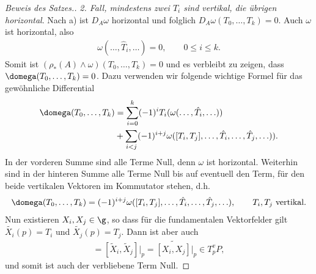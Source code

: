 \documentclass[%
	paper=a5,%
	fleqn,%
	DIV=18,%
	BCOR=0mm,
	fontsize=11pt,
	titlepage=false,%
	bibliography=totoc,
	DIV=18,%
	twoside=true,
	pdftitle=Riemannsche Geometrie,
	pdfauthor=Uwe Semmelmann,
	numbers=noendperiod]%
	{scrbook}
\begin{document}
\begin{proof}[Beweis des Satzes.]
\textit{2. Fall, mindestens zwei $T_i$ sind vertikal, die übrigen horizontal}.
Nach a) ist $D_A\omega$ horizontal und folglich
$D_A\omega(T_0,\ldots,T_k) = 0$. Auch $\omega$ ist horizontal, also
\begin{align*}
\omega(\ldots,\hat{T}_i,\ldots) = 0,\qquad 0\le i\le k.
\end{align*}
Somit ist $(\rho_*(A)\wedge\omega)(T_0,\ldots,T_k) = 0$ und es verbleibt zu
zeigen, dass $\domega(T_0,\ldots,T_k) =0$. Dazu verwenden wir
folgende wichtige Formel für das gewöhnliche Differential
\begin{align*}
\domega(T_0,\ldots,T_k) &= 
\sum_{i=0}^k (-1)^i T_i(\omega(\ldots,\hat{T}_i,\ldots))\\
&+
\sum_{i<j} (-1)^{i+j}
\omega([T_i,T_j],\ldots,\hat{T}_i,\ldots,\hat{T}_j,\ldots)).
\end{align*}
In der vorderen Summe sind alle Terme Null, denn $\omega$ ist horizontal.
Weiterhin sind in der hinteren Summe alle Terme Null bis auf eventuell den Term,
für den beide vertikalen Vektoren im Kommutator stehen, d.h.
\begin{align*}
\domega(T_0,\ldots,T_k) = (-1)^{i+j}
\omega([T_i,T_j],\ldots,\hat{T}_i,\ldots,\hat{T}_j,\ldots),\qquad
T_i,T_j\text{ vertikal}.
\end{align*}
Nun existieren $X_i,X_j\in \g$, so dass für die fundamentalen Vektorfelder gilt
$\tilde{X_i}(p) = T_i$ und $\tilde{X_j}(p) = T_j$. Dann ist aber auch
\begin{align*}
[T_i,T_j] = [\tilde{X}_i,\tilde{X}_j]\bigg|_{p} =
\widetilde{[X_i,X_j]}\bigg|_{p} \in T_p^vP,
\end{align*}
und somit ist auch der verbliebene Term Null.


\end{proof}
\end{document}
